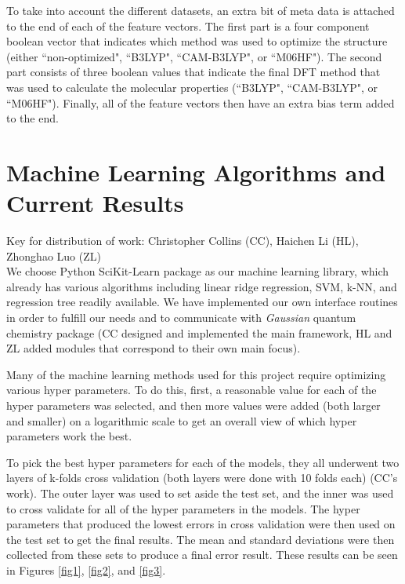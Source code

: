 \documentclass[12pt, oneside]{article}   	%
\begin{document}
To take into account the different datasets, an extra bit of meta data is attached to the end of each of the feature vectors. The first part is a four component boolean vector that indicates which method was used to optimize the structure (either ``non-optimized", ``B3LYP", ``CAM-B3LYP", or ``M06HF"). The second part consists of three boolean values that indicate the final DFT method that was used to calculate the molecular properties (``B3LYP", ``CAM-B3LYP", or ``M06HF"). Finally, all of the feature vectors then have an extra bias term added to the end.


\section{Machine Learning Algorithms and Current Results}
\noindent Key for distribution of work: Christopher Collins (CC), Haichen Li (HL), Zhonghao Luo (ZL) \\

We choose Python SciKit-Learn package\cite{scikit-learn} as our machine learning library, which already has various algorithms including linear ridge regression, SVM, k-NN, and regression tree readily available. We have implemented our own interface routines in order to fulfill our needs and to communicate with \textit{Gaussian} quantum chemistry package (CC designed and implemented the main framework, HL and ZL added modules that correspond to their own main focus).

Many of the machine learning methods used for this project require optimizing various hyper parameters. To do this, first, a reasonable value for each of the hyper parameters was selected, and then more values were added (both larger and smaller) on a logarithmic scale to get an overall view of which hyper parameters work the best.

To pick the best hyper parameters for each of the models, they all underwent two layers of k-folds cross validation (both layers were done with 10 folds each) (CC's work). The outer layer was used to set aside the test set, and the inner was used to cross validate for all of the hyper parameters in the models. The hyper parameters that produced the lowest errors in cross validation were then used on the test set to get the final results. The mean and standard deviations were then collected from these sets to produce a final error result. These results can be seen in Figures \ref{fig1}, \ref{fig2}, and \ref{fig3}.
\end{document}
